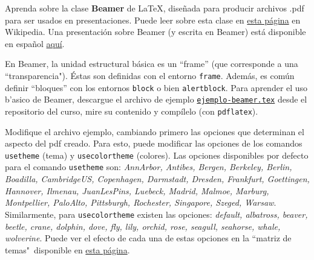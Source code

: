 \documentclass[11pt]{exam}
\begin{document}
\firstpageheadrule
\runningheadrule
{}
\cfoot{ }
\begin{flushleft}
\vspace{0.2in}

\vspace{0.25cm}
\end{flushleft}

\begin{questions}

\item Aprenda sobre la clase \textbf{Beamer} de \LaTeX, diseñada para producir archivos .pdf para ser usados en presentaciones. Puede leer sobre esta clase en \href{https://es.wikipedia.org/wiki/Beamer}{esta página} en Wikipedia. Una presentación sobre Beamer (y escrita en Beamer) está disponible en español \href{http://metodos.fam.cie.uva.es/~latex/apuntes/apuntes13.pdf}{aqu\'i}.

\item En Beamer, la unidad estructural básica es un ``frame'' (que corresponde a una ``transparencia"). Éstas son definidas con el entorno \texttt{frame}. Además, es  común definir ``bloques'' con los entornos \texttt{block} o bien \texttt{alertblock}. Para aprender el uso b'asico de Beamer, descargue el archivo de ejemplo \href{https://github.com/gfrubi/CC/blob/master/guias/06/ejemplo-beamer.tex}{\texttt{ejemplo-beamer.tex}} desde el repositorio del curso, mire su contenido y compílelo (con \texttt{pdflatex}). 

\item Modifique el archivo ejemplo, cambiando primero las opciones que determinan el aspecto del pdf creado. Para esto, puede modificar las opciones de los comandos \texttt{usetheme} (tema) y \texttt{usecolortheme} (colores). Las opciones disponibles por defecto para el comando \texttt{usetheme} son: \textit{AnnArbor, Antibes, Bergen, Berkeley, Berlin, Boadilla, CambridgeUS, Copenhagen, Darmstadt,  Dresden, Frankfurt, Goettingen, Hannover, Ilmenau, JuanLesPins, Luebeck, Madrid, Malmoe, Marburg, Montpellier, PaloAlto, Pittsburgh, Rochester, Singapore, Szeged, Warsaw}. Similarmente, para \texttt{usecolortheme} existen las opciones: \textit{default, albatross, beaver, beetle, crane, dolphin, dove, fly, lily, orchid, rose, seagull, seahorse, whale, wolverine}. Puede ver el efecto de cada una de estas opciones en la ``matriz de temas"\, disponible en \href{https://hartwork.org/beamer-theme-matrix/}{esta p\'agina}.


\end{questions}
\end{document}

